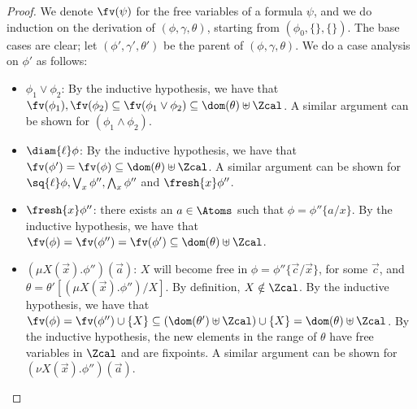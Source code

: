 \begin{proof}
	We denote $\fv(\psi)$ for the free variables of a formula $\psi$, 
	and we do induction on the derivation of $(\phi,\gamma,\theta)$, starting from $(\phi_0,\{\}, \{\})$. 
	The base cases are clear; let $(\phi',\gamma',\theta')$ be the parent of $(\phi, \gamma, \theta)$. 
	We do a case analysis on $\phi'$ as follows:
		\begin{itemize}
		\item $\phi_1 \lor \phi_2$: By the inductive hypothesis,  
		we have that $\fv(\phi_1), \fv(\phi_2) \subseteq \fv(\phi_1 \lor \phi_2) \subseteq \dom(\theta)\uplus \Zcal$.
		A similar argument can be shown for $(\phi_1 \land \phi_2)$.
				\item $\diam{\ell}\phi$: By the inductive hypothesis, 
		we have that $\fv(\phi') = \fv(\phi) \subseteq \dom(\theta) \uplus \Zcal$. 
		A similar argument can be shown for $\sq{\ell}\phi, \bigvee_x \phi'',  \bigwedge_x \phi''$ and $\fresh{x}\phi''$.
				\item $\fresh{x}\phi''$: there exists an $a \in \Atoms$ such that $\phi = \phi''\{a/x\}$. By the inductive hypothesis, we have that $\fv(\phi) = \fv(\phi'') = \fv(\phi') \subseteq \dom(\theta) \uplus \Zcal$.			
				\item $(\mu X(\vec x).\phi'')(\vec a)$: $X$ will become free in $\phi=\phi''\{\vec c/\vec x\}$, for some $\vec c$, and $\theta=\theta'[(\mu X(\vec x).\phi'')/X]$.
		By definition, $X\notin\Zcal$.
		By the inductive hypothesis, we have that 
		$\fv(\phi) =\fv(\phi'') \cup \{X\} \subseteq (\dom(\theta') \uplus \Zcal)\cup \{X\}=\dom(\theta) \uplus \Zcal$. 
		By the inductive hypothesis, the new elements in the range of $\theta$ have free variables in $\Zcal$
		and are fixpoints.
		A similar argument can be shown for $(\nu X(\vec x).\phi'')(\vec a)$.
	\end{itemize}
\end{proof}

\freshClosProps*


